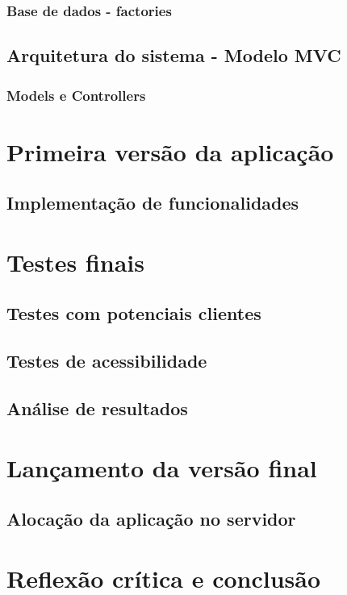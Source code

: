 \documentclass[11pt, twoside]{report}
\begin{document}
	\subsection{Base de dados - factories}
	\section{Arquitetura do sistema - Modelo MVC}
	\subsection{Models e Controllers}
	
	\chapter{Primeira versão da aplicação}
	\section{Implementação de funcionalidades}
	
	\chapter{Testes finais}
	\section{Testes com potenciais clientes}
	\section{Testes de acessibilidade}
	\section{Análise de resultados}
	
	\chapter{Lançamento da versão final}
	\section{Alocação da aplicação no servidor}
	
	
	\chapter{Reflexão crítica e conclusão}
	
	

	
	
	
\end{document}
